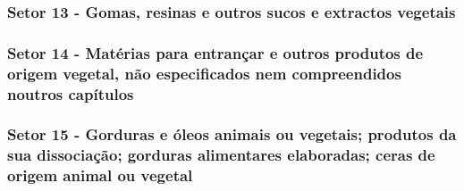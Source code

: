 \subsubsection{Setor 13 - Gomas, resinas e outros sucos e extractos vegetais}





\subsubsection{Setor 14 - Matérias para entrançar e outros produtos de origem vegetal, não especificados nem compreendidos noutros capítulos}





\subsubsection{Setor 15 - Gorduras e óleos animais ou vegetais; produtos da sua dissociação; gorduras alimentares elaboradas; ceras de origem animal ou vegetal}


 